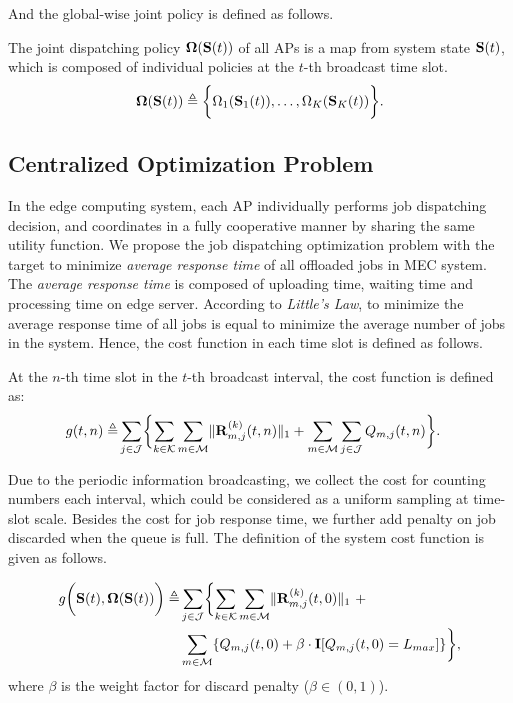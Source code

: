 And the global-wise joint policy is defined as follows.
\begin{definition}
    The joint dispatching policy $\boldsymbol{\Omega}(\mathbf{S}(t))$ of all APs is a map from system state $\mathbf{S}(t)$, which is composed of individual policies at the $t$-th broadcast time slot.
    \begin{align}
        \boldsymbol{\Omega}(\mathbf{S}(t)) \triangleq \bigg\{
            \Omega_{1}(\mathbf{S}_{1}(t)), \dots, \Omega_{K}(\mathbf{S}_{K}(t))
        \bigg\}.
    \end{align}
\end{definition}
\subsection{Centralized Optimization Problem}
In the edge computing system, each AP individually performs job dispatching decision, and coordinates in a fully cooperative manner by sharing the same utility function.
We propose the job dispatching optimization problem with the target to minimize \emph{average response time} of all offloaded jobs in MEC system.
The \emph{average response time} is composed of uploading time, waiting time and processing time on edge server.
According to \emph{Little's Law}, to minimize the average response time of all jobs is equal to minimize the average number of jobs in the system.
Hence, the cost function in each time slot is defined as follows.
\begin{definition}
    At the $n$-th time slot in the $t$-th broadcast interval, the cost function is defined as:
    \begin{align}
        g(t,n) \define & \sum_{j\in\jSpace}\Brace{
            \sum_{k\in\apSet}\sum_{m\in\esSet} \Inorm{\vec{R}^{(k)}_{m,j}(t,n)} + \sum_{m\in\esSet}\sum_{j\in\jSpace} Q_{m,j}(t,n)
        }.
    \end{align}
\end{definition}

Due to the periodic information broadcasting, we collect the cost for counting numbers each interval, which could be considered as a uniform sampling at time-slot scale.
Besides the cost for job response time, we further add penalty on job discarded when the queue is full.
The definition of the system cost function is given as follows.
\begin{definition}
    \begin{align}
        g\Paren{\Stat(t), \Policy(\Stat(t))} \define
            &\sum_{j\in\jSpace} \Brace{
                \sum_{k\in\apSet} \sum_{m\in\esSet} \Inorm{\vec{R}^{(k)}_{m,j}(t,0)}~+
                \nonumber\\
                &\sum_{m\in\esSet} \{ Q_{m,j}(t,0) + \beta \cdot \mat{I}[Q_{m,j}(t,0)=L_{max}] \}
            },
    \end{align}
    where $\beta$ is the weight factor for discard penalty ($\beta \in (0,1)$).
\end{definition}

